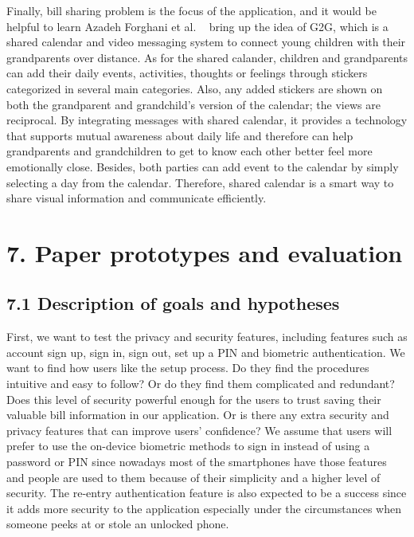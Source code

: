 \documentclass{sigchi}
\begin{document}
Finally, bill sharing problem is the focus of the application, and it would be helpful to learn Azadeh Forghani et al. ~\cite{Forghani} bring up the idea of G2G, which is a shared calendar and video messaging system to connect young children with their grandparents over distance. As for the shared calander, children and grandparents can add their daily events, activities, thoughts or feelings through stickers categorized in several main categories. Also, any added stickers are shown on both the grandparent and grandchild's version of the calendar; the views are reciprocal. By integrating messages with shared calendar, it provides a technology that supports mutual awareness about daily life and therefore can help grandparents and grandchildren to get to know each other better feel more emotionally close. Besides, both parties can add event to the calendar by simply selecting a day from the calendar. Therefore, shared calendar is a smart way to share visual information and communicate efficiently. 



\section{7. Paper prototypes and evaluation}

\subsection{7.1 Description of goals and hypotheses}


First, we want to test the privacy and security features, including features such as account sign up, sign in, sign out, set up a PIN and biometric authentication. We want to find how users like the setup process. Do they find the procedures intuitive and easy to follow? Or do they find them complicated and redundant? Does this level of security powerful enough for the users to trust saving their valuable bill information in our application. Or is there any extra security and privacy features that can improve users' confidence? We assume that users will prefer to use the on-device biometric methods to sign in instead of using a password or PIN since nowadays most of the smartphones have those features and people are used to them because of their simplicity and a higher level of security. The re-entry authentication feature is also expected to be a success since it adds more security to the application especially under the circumstances when someone peeks at or stole an unlocked phone.
\end{document}
